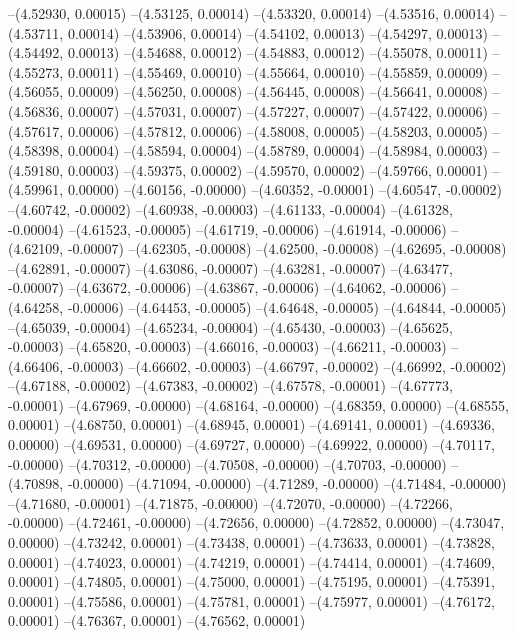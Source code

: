 --(4.52930, 0.00015)
--(4.53125, 0.00014)
--(4.53320, 0.00014)
--(4.53516, 0.00014)
--(4.53711, 0.00014)
--(4.53906, 0.00014)
--(4.54102, 0.00013)
--(4.54297, 0.00013)
--(4.54492, 0.00013)
--(4.54688, 0.00012)
--(4.54883, 0.00012)
--(4.55078, 0.00011)
--(4.55273, 0.00011)
--(4.55469, 0.00010)
--(4.55664, 0.00010)
--(4.55859, 0.00009)
--(4.56055, 0.00009)
--(4.56250, 0.00008)
--(4.56445, 0.00008)
--(4.56641, 0.00008)
--(4.56836, 0.00007)
--(4.57031, 0.00007)
--(4.57227, 0.00007)
--(4.57422, 0.00006)
--(4.57617, 0.00006)
--(4.57812, 0.00006)
--(4.58008, 0.00005)
--(4.58203, 0.00005)
--(4.58398, 0.00004)
--(4.58594, 0.00004)
--(4.58789, 0.00004)
--(4.58984, 0.00003)
--(4.59180, 0.00003)
--(4.59375, 0.00002)
--(4.59570, 0.00002)
--(4.59766, 0.00001)
--(4.59961, 0.00000)
--(4.60156, -0.00000)
--(4.60352, -0.00001)
--(4.60547, -0.00002)
--(4.60742, -0.00002)
--(4.60938, -0.00003)
--(4.61133, -0.00004)
--(4.61328, -0.00004)
--(4.61523, -0.00005)
--(4.61719, -0.00006)
--(4.61914, -0.00006)
--(4.62109, -0.00007)
--(4.62305, -0.00008)
--(4.62500, -0.00008)
--(4.62695, -0.00008)
--(4.62891, -0.00007)
--(4.63086, -0.00007)
--(4.63281, -0.00007)
--(4.63477, -0.00007)
--(4.63672, -0.00006)
--(4.63867, -0.00006)
--(4.64062, -0.00006)
--(4.64258, -0.00006)
--(4.64453, -0.00005)
--(4.64648, -0.00005)
--(4.64844, -0.00005)
--(4.65039, -0.00004)
--(4.65234, -0.00004)
--(4.65430, -0.00003)
--(4.65625, -0.00003)
--(4.65820, -0.00003)
--(4.66016, -0.00003)
--(4.66211, -0.00003)
--(4.66406, -0.00003)
--(4.66602, -0.00003)
--(4.66797, -0.00002)
--(4.66992, -0.00002)
--(4.67188, -0.00002)
--(4.67383, -0.00002)
--(4.67578, -0.00001)
--(4.67773, -0.00001)
--(4.67969, -0.00000)
--(4.68164, -0.00000)
--(4.68359, 0.00000)
--(4.68555, 0.00001)
--(4.68750, 0.00001)
--(4.68945, 0.00001)
--(4.69141, 0.00001)
--(4.69336, 0.00000)
--(4.69531, 0.00000)
--(4.69727, 0.00000)
--(4.69922, 0.00000)
--(4.70117, -0.00000)
--(4.70312, -0.00000)
--(4.70508, -0.00000)
--(4.70703, -0.00000)
--(4.70898, -0.00000)
--(4.71094, -0.00000)
--(4.71289, -0.00000)
--(4.71484, -0.00000)
--(4.71680, -0.00001)
--(4.71875, -0.00000)
--(4.72070, -0.00000)
--(4.72266, -0.00000)
--(4.72461, -0.00000)
--(4.72656, 0.00000)
--(4.72852, 0.00000)
--(4.73047, 0.00000)
--(4.73242, 0.00001)
--(4.73438, 0.00001)
--(4.73633, 0.00001)
--(4.73828, 0.00001)
--(4.74023, 0.00001)
--(4.74219, 0.00001)
--(4.74414, 0.00001)
--(4.74609, 0.00001)
--(4.74805, 0.00001)
--(4.75000, 0.00001)
--(4.75195, 0.00001)
--(4.75391, 0.00001)
--(4.75586, 0.00001)
--(4.75781, 0.00001)
--(4.75977, 0.00001)
--(4.76172, 0.00001)
--(4.76367, 0.00001)
--(4.76562, 0.00001)
